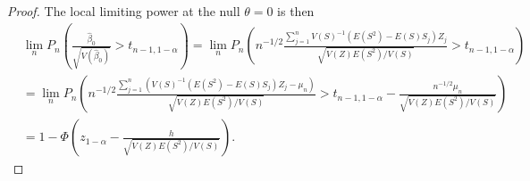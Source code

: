 \documentclass{article}
\newcommand{\E}{E}
\renewcommand{\P}{P}
\newcommand{\V}{V}
\begin{document}
\begin{proof}
  The local limiting power at the null $\theta=0$ is then
  \begin{align}
    &\lim_n \P_n\left(\frac{\hat{\beta}_0}{\sqrt{\V(\hat{\beta}_0)}} > t_{n-1,1-\alpha}\right)
      = \lim_n\P_n\left(n^{-1/2}\frac{\sum_{j=1}^n\V(S)^{-1}(\E(S^2)-\E(S)S_j)Z_j}{\sqrt{\V(Z)\E(S^2)/\V(S)}} > t_{n-1,1-\alpha} \right)\\
    &= \lim_n\P_n\left(n^{-1/2}\frac{\sum_{j=1}^n\left(\V(S)^{-1}(\E(S^2)-\E(S)S_j)Z_j - \mu_n\right)}{\sqrt{\V(Z)\E(S^2)/\V(S)}} > t_{n-1,1-\alpha} -\frac{n^{-1/2}\mu_n}{\sqrt{\V(Z)\E(S^2)/\V(S)}}   \right)\\
    &= 1-\Phi\left(z_{1-\alpha} - \frac{h}{\sqrt{\V(Z)\E(S^2)/\V(S)}}\right).
  \end{align}
  
\end{proof}
\end{document}
